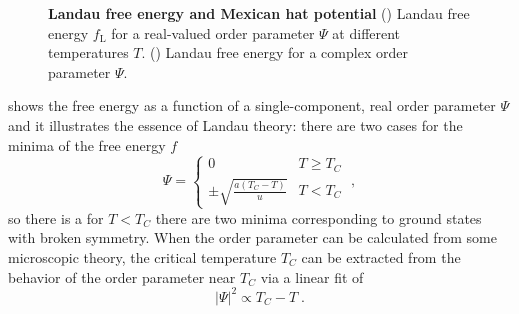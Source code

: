 \documentclass[../notes.tex]{subfiles}
\begin{document}
\begin{figure}[t]
	\centering
	\begin{subfigure}[b]{0.5\textwidth}
		\centering
		\caption{\hfill\null}\label{sfig:Landau free energy}
		
	\end{subfigure}%
	\begin{subfigure}[b]{0.5\textwidth}
		\centering
		\caption{\hfill\null}\label{sfig:Ginzburg Landau free energy}
		
	\end{subfigure}
	\caption{
		\textbf{Landau free energy and Mexican hat potential} () Landau free energy \(f_{\mathrm{L}}\) for a real-valued order parameter \(\Psi\) at different temperatures \(T\). () Landau free energy for a complex order parameter \(\Psi\).
	} 
	\label{fig:Landau free energy and Ginzburg-Landau free energy}
\end{figure}

 shows the free energy as a function of a single-component, real order parameter \(\Psi\) and it illustrates the essence of Landau theory: there are two cases for the minima of the free energy \(f\)
\begin{equation}
	\Psi = \begin{cases}
		0 & T \geq T_C \\
		\pm \sqrt{\frac{a (T_C - T)}{u}} & T < T_C
	\end{cases} \;,
\end{equation}
so there is a for \(T < T_C\) there are two minima corresponding to ground states with broken symmetry.
When the order parameter can be calculated from some microscopic theory, the critical temperature \(T_C\) can be extracted from the behavior of the order parameter near \(T_C\) via a linear fit of
\begin{equation}
	\vert \Psi \vert^2 \propto T_C - T \;.
\end{equation}
\end{document}
